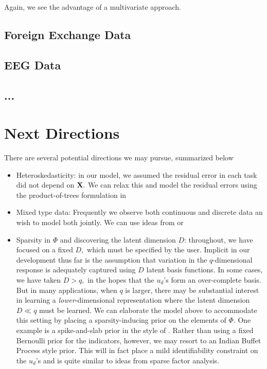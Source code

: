 \documentclass[12pt]{article}
\begin{document}
Again, we see the advantage of a multivariate approach.


\subsection{Foreign Exchange Data}


\subsection{EEG Data}


\subsection{...}


\newpage

\section{Next Directions}

There are several potential directions we may pursue, summarized below
\begin{itemize}
\item{Heteroskedasticity: in our model, we assumed the residual error in each task did not depend on $\mathbf{X}.$ We can relax this and model the residual errors using the product-of-trees formulation in \citet{Pratola2017}}
\item{Mixed type data: Frequently we observe both continuous and discrete data an wish to model both jointly. We can use ideas from \citet{Pourmohamad2016} or \citet{Murray2017}}
\item{Sparsity in $\Phi$ and discovering the latent dimension $D$: throughout, we have focused on a fixed $D,$ which must be specified by the user. Implicit in our development thus far is the assumption that variation in the $q$-dimensional response is adequately captured using $D$ latent basis functions. In some cases, we have taken $D > q,$ in the hopes that the $u_{d}$'s form an over-complete basis. But in many applications, when $q$ is larger, there may be substantial interest in learning a \textit{lower}-dimensional representation where the latent dimension $D \ll q$ must be learned. We can elaborate the model above to accommodate this setting by placing a sparsity-inducing prior on the elements of $\Phi.$ One example is a spike-and-slab prior in the style of \citet{Titsias2011}. Rather than using a fixed Bernoulli prior for the indicators, however, we may resort to an Indian Buffet Process style prior. This will in fact place a mild identifiability constraint on the $u_{d}$'s and is quite similar to ideas from sparse factor analysis.}
\end{itemize}
\end{document}
